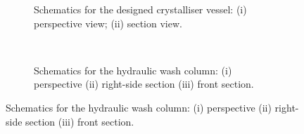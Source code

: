 \begin{figure}[h]
    \centering
    \begin{subfigure}[h]{0.5\textwidth}
    \centering
    
    \caption{Schematics for the designed crystalliser vessel: (i) perspective view; (ii) section view.}
    \label{fig:crystalliser schematic executive}
    \end{subfigure}%
    ~ 
    \begin{subfigure}[h]{0.5\textwidth}
    \centering
    
    \caption{Schematics for the hydraulic wash column: (i) perspective (ii) right-side section (iii) front section.}
    \label{fig:wash column schematic executive}
    \end{subfigure}
\end{figure}
